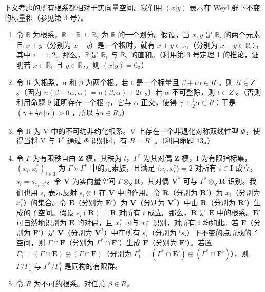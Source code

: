 
下文考虑的所有根系都相对于实向量空间。我们用 \((x|y)\) 表示在 Weyl 群下不变的标量积（参见第 3 号）。

\begin{enumerate}
\def\labelenumi{\arabic{enumi})}
\item
  令 \(\mathbb{R}\) 为根系，\(\mathbb{R} = \mathbb{R}_1 \cup \mathbb{R}_2\) 为 \(\mathbb{R}\) 的一个划分。假设，当 \(x, y\) 是 \(\mathbb{R}_i\) 的两个元素且 \(x + y\)（分别为 \(x - y\)）是一个根时，就有 \(x + y \in \mathbb{R}_i\)（分别为 \(x - y \in \mathbb{R}_i\)），其中 \(i = 1, 2\)。那么，\(\mathbb{R}\) 是 \(\mathbb{R}_1\) 与 \(\mathbb{R}_2\) 的直和。（利用第 3 号定理 1 的推论，证明若 \(x \in \mathbb{R}_1\) 且 \(y \in \mathbb{R}_2\)，则 \((x|y) = 0\)。）
\item
  令 R 为根系，\(\alpha\) 和 \(\beta\) 为两个根。若 t 是一个标量且 \(\beta + t\alpha \in R\) ，则 \(2t \in Z\) 。（因为 \(n(\beta + t\alpha, \alpha) = n(\beta, \alpha) + 2t\) 。）若 \(\alpha\) 不可整除，则 \(t \in Z\) 。（否则利用命题 9 证明存在一个根 \(\gamma\)，它与 \(\alpha\) 正交，使得 \(\gamma + \frac{1}{2}\alpha \in R\)：于是 \((\gamma + \frac{1}{2}\alpha|\alpha) > 0\) ，所以 \(\frac{1}{2}\alpha \in R\)。）
\item
  令 R 为 V 中的不可约非约化根系。V 上存在一个非退化对称双线性型 \(\Phi\)，使得当将 V 与 \(V^{*}\) 通过 \(\Phi\) 识别时，有 \(R = R^{-}\)。（利用命题 13。）
\item
  令 \(\Gamma\) 为有限秩自由 \(\mathbf{Z}\)-模，其秩为 \(l\)，\(\Gamma^{*}\) 为其对偶 \(\mathbf{Z}\)-模，I 为有限指标集，\((x_{i}, x_{i}^{*})_{i \in \mathbf{I}}\) 为 \(\Gamma \times \Gamma^{*}\) 中的元素族，且满足 \(\langle x_{i}, x_{i}^{*} \rangle = 2\) 对所有 \(i \in \mathbf{I}\) 成立，\(s_{i} = s_{x_{i}, x_{i}^{*}}\)。令 \(\mathbf{V}\) 为实向量空间 \(\Gamma \otimes_{\mathbf{Z}} \mathbf{R}\)，其对偶 \(\mathbf{V}^{*}\) 可与 \(\Gamma^{*} \otimes_{\mathbf{Z}} \mathbf{R}\) 识别。我们也用 \(s_{i}\) 表示反射 \(s_{i} \otimes 1\) 在 \(\mathbf{V}\) 中的作用。令 \(\mathbf{R}\)（分别为 \(\mathbf{R}'\)）为 \(x_{i}\)（分别为 \(x_{i}^{*}\)）的集合。令 \(\mathbf{E}\)（分别为 \(\mathbf{E}'\)）为 \(\mathbf{V}\)（分别为 \(\mathbf{V}^{*}\)）中由 \(\mathbf{R}\)（分别为 \(\mathbf{R}'\)）生成的子空间。假设 \(s_{i}(\mathbf{R}) = \mathbf{R}\) 对所有 \(i\) 成立。那么，\(\mathbf{R}\) 是 \(\mathbf{E}\) 中的根系。\(\mathbf{E}'\) 可自然地识别为 \(\mathbf{E}\) 的对偶，且 \(x_{i}^{*}\) 可与 \(x_{i}^{-}\) 识别，对所有 \(i\) 均如此。若 \(\mathbf{F}\)（分别为 \(\mathbf{F}'\)）是 \(\mathbf{V}\)（分别为 \(\mathbf{V}^{*}\)）中在所有 \(s_{i}\)（分别为 \(^t s_{i}\)）下不变的点所成的子空间，则 \(\Gamma \cap \mathbf{F}\)（分别为 \(\Gamma^{*} \cap \mathbf{F}'\)）生成 \(\mathbf{F}\)（分别为 \(\mathbf{F}'\)）。若置 \(\Gamma_{1} = (\Gamma \cap \mathbf{E}) \oplus (\Gamma \cap \mathbf{F})\)（分别为 \(\Gamma_{1}^{*} = (\Gamma^{*} \cap \mathbf{E}') \oplus (\Gamma^{*} \cap \mathbf{F}')\)），则 \(\Gamma / \Gamma_{1}\) 与 \(\Gamma^{*} / \Gamma_{1}^{*}\) 是同构的有限群。
\item
  令 \(R\) 为不可约根系。对任意 \(\beta \in R\)，
\end{enumerate}

